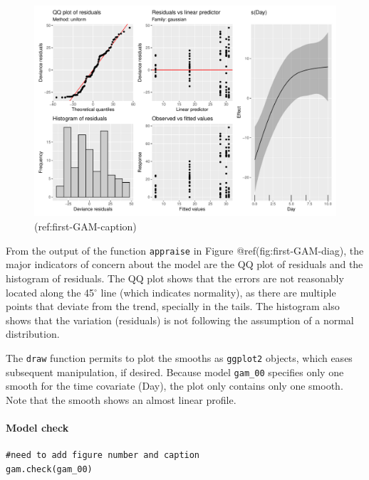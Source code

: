 \documentclass[Royal,times,sagev]{sagej}
\begin{document}
\begin{figure}

{\centering \includegraphics[width=0.75\linewidth]{Full_document_SAGE_files/figure-latex/first-GAM-diag-1} 

}

\caption{(ref:first-GAM-caption)}\label{fig:first-GAM-diag}
\end{figure}

From the output of the function \texttt{appraise} in Figure
@ref(fig:first-GAM-diag), the major indicators of concern about the
model are the QQ plot of residuals and the histogram of residuals. The
QQ plot shows that the errors are not reasonably located along the
45\(^{\circ}\) line (which indicates normality), as there are multiple
points that deviate from the trend, specially in the tails. The
histogram also shows that the variation (residuals) is not following the
assumption of a normal distribution.

The \texttt{draw} function permits to plot the smooths as
\texttt{ggplot2} objects, which eases subsequent manipulation, if
desired. Because model \texttt{gam\_00} specifies only one smooth for
the time covariate (Day), the plot only contains only one smooth. Note
that the smooth shows an almost linear profile.

\hypertarget{model-check}{%
\paragraph{Model check}\label{model-check}}

\begin{verbatim}
#need to add figure number and caption
gam.check(gam_00)
\end{verbatim}
\end{document}
